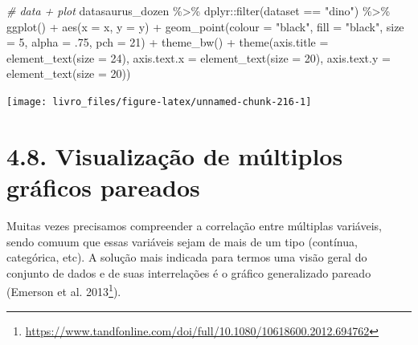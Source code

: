 \documentclass[
]{book}
\newenvironment{Shaded}{\begin{snugshade}}{\end{snugshade}}
\newcommand{\AttributeTok}[1]{\textcolor[rgb]{0.61,0.61,0.61}{#1}}
\newcommand{\CommentTok}[1]{\textcolor[rgb]{0.37,0.37,0.37}{\textit{#1}}}
\newcommand{\DecValTok}[1]{\textcolor[rgb]{0.06,0.06,0.06}{#1}}
\newcommand{\FunctionTok}[1]{\textcolor[rgb]{0,0,0}{#1}}
\newcommand{\NormalTok}[1]{#1}
\newcommand{\SpecialCharTok}[1]{\textcolor[rgb]{0,0,0}{#1}}
\newcommand{\StringTok}[1]{\textcolor[rgb]{0.5,0.5,0.5}{#1}}
\renewcommand{\href}[2]{#2\footnote{\url{#1}}}
\begin{document}
\begin{Shaded}
\begin{Highlighting}[]

\CommentTok{\# data + plot}
\NormalTok{datasaurus\_dozen }\SpecialCharTok{\%\textgreater{}\%} 
\NormalTok{    dplyr}\SpecialCharTok{::}\FunctionTok{filter}\NormalTok{(dataset }\SpecialCharTok{==} \StringTok{"dino"}\NormalTok{) }\SpecialCharTok{\%\textgreater{}\%} 
    \FunctionTok{ggplot}\NormalTok{() }\SpecialCharTok{+}
    \FunctionTok{aes}\NormalTok{(}\AttributeTok{x =}\NormalTok{ x, }\AttributeTok{y =}\NormalTok{ y) }\SpecialCharTok{+}
    \FunctionTok{geom\_point}\NormalTok{(}\AttributeTok{colour =} \StringTok{"black"}\NormalTok{, }\AttributeTok{fill =} \StringTok{"black"}\NormalTok{, }
               \AttributeTok{size =} \DecValTok{5}\NormalTok{, }\AttributeTok{alpha =}\NormalTok{ .}\DecValTok{75}\NormalTok{, }\AttributeTok{pch =} \DecValTok{21}\NormalTok{) }\SpecialCharTok{+}
    \FunctionTok{theme\_bw}\NormalTok{() }\SpecialCharTok{+}
    \FunctionTok{theme}\NormalTok{(}\AttributeTok{axis.title =} \FunctionTok{element\_text}\NormalTok{(}\AttributeTok{size =} \DecValTok{24}\NormalTok{),}
        \AttributeTok{axis.text.x =} \FunctionTok{element\_text}\NormalTok{(}\AttributeTok{size =} \DecValTok{20}\NormalTok{),}
        \AttributeTok{axis.text.y =} \FunctionTok{element\_text}\NormalTok{(}\AttributeTok{size =} \DecValTok{20}\NormalTok{))}
\end{Highlighting}
\end{Shaded}

\begin{center}\texttt{[image: livro\_files/figure-latex/unnamed-chunk-216-1]} \end{center}

\hypertarget{visualizauxe7uxe3o-de-muxfaltiplos-gruxe1ficos-pareados}{%
\section{4.8. Visualização de múltiplos gráficos pareados}\label{visualizauxe7uxe3o-de-muxfaltiplos-gruxe1ficos-pareados}}

Muitas vezes precisamos compreender a correlação entre múltiplas variáveis, sendo comuum que essas variáveis sejam de mais de um tipo (contínua, categórica, etc). A solução mais indicada para termos uma visão geral do conjunto de dados e de suas interrelações é o gráfico generalizado pareado (\href{https://www.tandfonline.com/doi/full/10.1080/10618600.2012.694762}{Emerson et al. 2013}).
\end{document}
